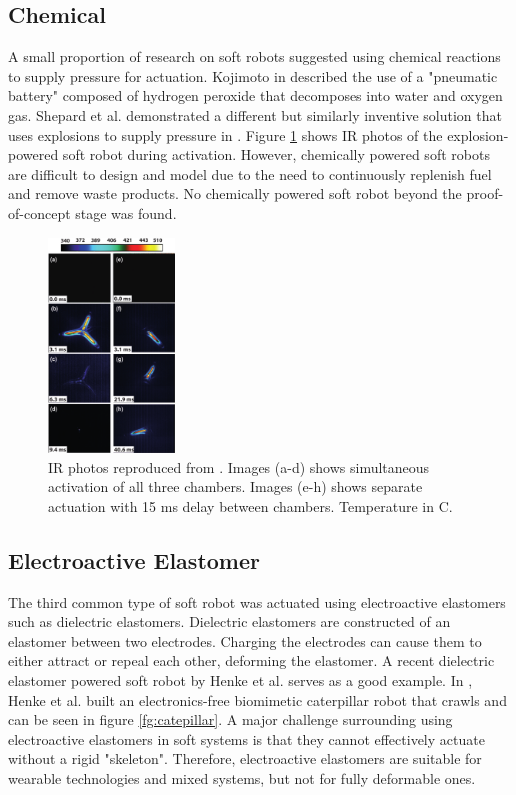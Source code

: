 \documentclass[a4paper,12pt]{article}
\begin{document}
\subsection{Chemical}
A small proportion of research on soft robots suggested using chemical reactions to supply pressure for actuation. Kojimoto in \cite{kojimotoPneumaticBatteryChemical2012} described the use of a "pneumatic battery" composed of hydrogen peroxide that decomposes into water and oxygen gas. Shepard et al. demonstrated a different but similarly inventive solution that uses explosions to supply pressure in \cite{shepherdUsingExplosionsPower2013}. Figure \ref{fg:explosions} shows IR photos of the explosion-powered soft robot during activation. However, chemically powered soft robots are difficult to design and model due to the need to continuously replenish fuel and remove waste products. No chemically powered soft robot beyond the proof-of-concept stage was found.

\begin{figure}[h!]
    \centering
    \includegraphics[width=0.3\textwidth]{explosions.png}
    \caption{IR photos reproduced from \cite{shepherdUsingExplosionsPower2013}. Images (a-d) shows simultaneous activation of all three chambers. Images (e-h) shows separate actuation with 15 ms delay between chambers. Temperature in \degree C.}
    \label{fg:explosions}
\end{figure}

\subsection{Electroactive Elastomer}
The third common type of soft robot was actuated using electroactive elastomers such as dielectric elastomers. Dielectric elastomers are constructed of an elastomer between two electrodes. Charging the electrodes can cause them to either attract or repeal each other, deforming the elastomer. A recent dielectric elastomer powered soft robot by Henke et al. \cite{henkeSoftDielectricElastomer2017} serves as a good example. In \cite{henkeSoftDielectricElastomer2017}, Henke et al. built an electronics-free biomimetic caterpillar robot that crawls and can be seen in figure \ref{fg:catepillar}. A major challenge surrounding using electroactive elastomers in soft systems is that they cannot effectively actuate without a rigid "skeleton". Therefore, electroactive elastomers are suitable for wearable technologies and mixed systems, but not for fully deformable ones.
\end{document}
